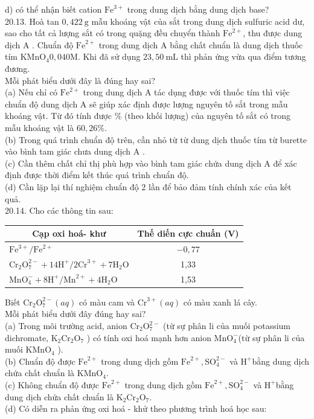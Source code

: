 \documentclass[10pt]{article}
\begin{document}
d) có thể nhận biết cation $\mathrm{Fe}^{3+}$ trong dung dịch bằng dung dịch base?\\
20.13. Hoà tan $0,422 \mathrm{~g}$ mẫu khoáng vật của sắt trong dung dịch sulfuric acid dư, sao cho tất cả lượng sắt có trong quặng đều chuyển thành $\mathrm{Fe}^{2+}$, thu được dung dịch A . Chuẩn độ $\mathrm{Fe}^{2+}$ trong dung dịch A bằng chất chuẩn là dung dịch thuốc tím $\mathrm{KMnO}_{4} 0,040 \mathrm{M}$. Khi đã sử dụng $23,50 \mathrm{~mL}$ thì phản ứng vừa qua điểm tương đương.\\
Mỗi phát biểu dưới đây là đúng hay sai?\\
(a) Nếu chỉ có $\mathrm{Fe}^{2+}$ trong dung dịch A tác dụng được với thuốc tím thì việc chuẩn độ dung dịch A sẽ giúp xác định được lượng nguyên tố sắt trong mẫu khoáng vật. Từ đó tính được \% (theo khối lượng) của nguyên tố sắt có trong mẫu khoáng vật là $60,26 \%$.\\
(b) Trong quá trình chuẩn độ trên, cần nhỏ từ từ dung dịch thuốc tím từ burette vào bình tam giác chưa dung dịch A .\\
(c) Cần thêm chất chỉ thị phù hợp vào bình tam giác chứa dung dịch A để xác định được thời điểm kết thúc quá trình chuẩn độ.\\
(d) Cần lặp lại thí nghiệm chuẩn độ 2 lần để bảo đảm tính chính xác của kết quả.\\
20.14. Cho các thông tin sau:

\begin{center}
\begin{tabular}{|l|c|}
\hline
\multicolumn{1}{|c|}{Cạp oxi hoá- khư} & Thế diến cực chuấn (V) \\
\hline
$\mathrm{Fe}^{3+} / \mathrm{Fe}^{2+}$ & $-0,77$ \\
\hline
$\mathrm{Cr}_{2} \mathrm{O}_{7}^{2-}+14 \mathrm{H}^{+} / 2 \mathrm{Cr}^{3+}+7 \mathrm{H}_{2} \mathrm{O}$ & 1,33 \\
\hline
$\mathrm{MnO}_{4}^{-}+8 \mathrm{H}^{+} / \mathrm{Mn}^{2+}+4 \mathrm{H}_{2} \mathrm{O}$ & 1,53 \\
\hline
\end{tabular}
\end{center}

Biết $\mathrm{Cr}_{2} \mathrm{O}_{7}^{2-}(a q)$ có màu cam và $\mathrm{Cr}^{3+}(a q)$ có màu xanh lá cây.\\
Mỗi phát biểu dưới đây đúng hay sai?\\
(a) Trong môi trường acid, anion $\mathrm{Cr}_{2} \mathrm{O}_{7}^{2-}$ (từ sự phân li của muối potassium dichromate, $\mathrm{K}_{2} \mathrm{Cr}_{2} \mathrm{O}_{7}$ ) có tính oxi hoá mạnh hơn anion $\mathrm{MnO}_{4}^{-}$(từ sự phân li của muối $\mathrm{KMnO}_{4}$ ).\\
(b) Chuẩn độ được $\mathrm{Fe}^{2+}$ trong dung dịch gồm $\mathrm{Fe}^{2+}, \mathrm{SO}_{4}^{2-}$ và $\mathrm{H}^{+}$bằng dung dịch chứa chất chuẩn là $\mathrm{KMnO}_{4}$.\\
(c) Không chuẩn độ được $\mathrm{Fe}^{2+}$ trong dung dịch gồm $\mathrm{Fe}^{2+}, \mathrm{SO}_{4}^{2-}$ và $\mathrm{H}^{+}$bằng dung dịch chứa chất chuẩn là $\mathrm{K}_{2} \mathrm{Cr}_{2} \mathrm{O}_{7}$.\\
(d) Có diễn ra phản ứng oxi hoá - khử theo phương trình hoá học sau:
\end{document}
